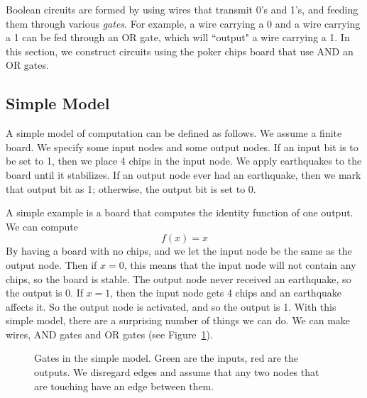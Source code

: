 \documentclass[runningheads,a4paper]{llncs}
\begin{document}
Boolean circuits are formed by using wires that transmit 0's and 1's, and feeding them through various \emph{gates}. For example, a wire carrying a 0 and a wire carrying a 1 can be fed through an OR gate, which will ``output" a wire carrying a 1. In this section, we construct circuits using the poker chips board that use AND an OR gates. 

\subsection{Simple Model}

A simple model of computation can be defined as follows. We assume a finite board. We specify some input nodes and some output nodes. If an input bit is to be set to 1, then we place 4 chips in the input node. We apply earthquakes to the board until it stabilizes. If an output node ever had an earthquake, then we mark that output bit as 1; otherwise, the output bit is set to 0. 

A simple example is a board that computes the identity function of one output. We can compute 
\[ f(x) = x \]
By having a board with no chips, and we let the input node be the same as the output node. Then if $x = 0$, this means that the input node will not contain any chips, so the board is stable. The output node never received an earthquake, so the output is 0. If $x = 1$, then the input node gets 4 chips and an earthquake affects it. So the output node is activated, and so the output is 1.
With this simple model, there are a surprising number of things we can do. We can make wires, AND gates and OR gates (see Figure~\ref{fig:simplegates}). 

\begin{figure}
\centering
{}
\qquad\qquad
{}
\qquad\qquad
{}
\caption{Gates in the simple model. Green are the inputs, red are the outputs. We disregard edges and assume that any two nodes that are touching have an edge between them.}
\label{fig:simplegates}
\end{figure}
\end{document}
